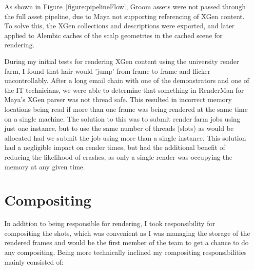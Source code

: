 \documentclass[11pt]{article}
\begin{document}
As shown in Figure~\ref{figure:pipelineFlow}, Groom assets were not passed through the full asset pipeline, due to Maya not supporting referencing of XGen content. To solve this, the XGen collections and descriptions were exported, and later applied to Alembic caches of the scalp geometries in the cached scene for rendering.

During my initial tests for rendering XGen content using the university render farm, I found that hair would 'jump' from frame to frame and flicker uncontrollably. After a long email chain with one of the demonstrators and one of the IT technicians, we were able to determine that something in RenderMan for Maya's XGen parser was not thread safe. This resulted in incorrect memory locations being read if more than one frame was being rendered at the same time on a single machine. The solution to this was to submit render farm jobs using just one instance, but to use the same number of threads (slots) as would be allocated had we submit the job using more than a single instance. This solution had a negligible impact on render times, but had the additional benefit of reducing the likelihood of crashes, as only a single render was occupying the memory at any given time.

\section{Compositing}

In addition to being responsible for rendering, I took responsibility for compositing the shots, which was convenient as I was managing the storage of the rendered frames and would be the first member of the team to get a chance to do any compositing. Being more technically inclined my compositing responsibilities mainly consisted of:
\end{document}
